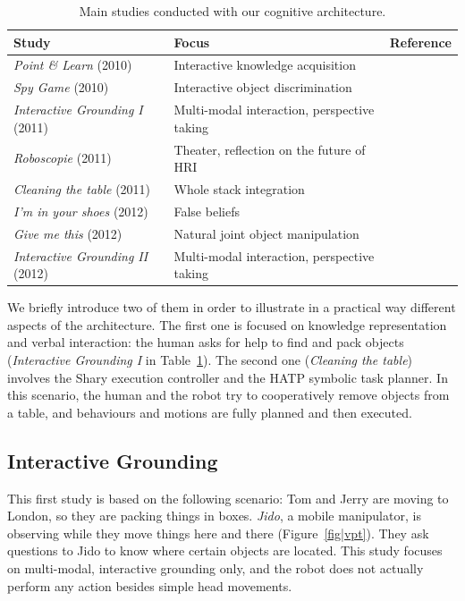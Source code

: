 \documentclass[preprint,3p,times]{elsarticle}
\begin{document}
\begin{table}
\begin{center}

\begin{tabular}{lll}
 \bf{Study} & Focus & Reference \\
\hline
{\it Point \& Learn} (2010) & Interactive knowledge acquisition & \cite{Lemaignan2010} \\
{\it Spy Game} (2010) & Interactive object discrimination & \cite{Ros2010b} \\
{\it Interactive Grounding I} (2011) & Multi-modal interaction, perspective taking & \cite{lemaignan2011what} \\
{\it Roboscopie} (2011) & Theater, reflection on the future of HRI & \cite{lemaignan2012roboscopie} \\
{\it Cleaning the table} (2011) & Whole stack integration & \cite{Alami2011} \\
{\it I'm in your shoes} (2012) & False beliefs & \cite{warnier2012when} \\
{\it Give me this} (2012) & Natural joint object manipulation & \cite{gharbi2013natural} \\
{\it Interactive Grounding II} (2012) & Multi-modal interaction, perspective taking & \cite{lemaignan2013talking} \\
\hline

\end{tabular}
\end{center}
\caption{Main studies conducted with our cognitive architecture.}
\label{table|experiments}
\end{table}

We briefly introduce two of them in order to illustrate in a practical way
different aspects of the architecture.  The first one is focused on knowledge
representation and verbal interaction: the human asks for help to find and pack
objects ({\it Interactive Grounding I} in Table~\ref{table|experiments}). The
second one ({\it Cleaning the table}) involves the {\sc Shary} execution
controller and the HATP symbolic task planner. In this scenario, the human and
the robot try to cooperatively remove objects from a table, and behaviours and
motions are fully planned and then executed.

\subsection{Interactive Grounding}
\label{moving-london}

This first study is based on the following scenario: Tom and Jerry are moving to
London, so they are packing things in boxes. \emph{Jido}, a mobile 
manipulator, is observing while they move things here and there
(Figure~\ref{fig|vpt}).  They ask questions to Jido to know where certain
objects are located. This study focuses on multi-modal, interactive grounding only, and
the robot does not actually perform any action besides simple head movements.
\end{document}
